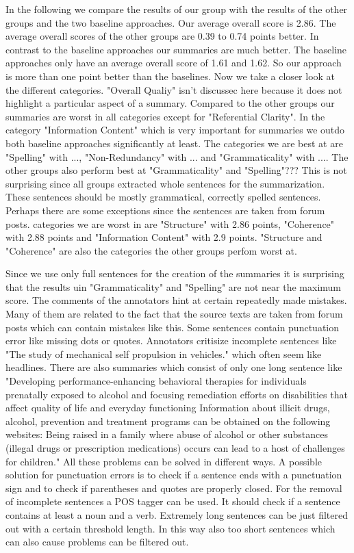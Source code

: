 In the following we compare the results of our group with the results of the other groups and the two baseline approaches. Our average overall score is 2.86. The average overall scores of the other groups are 0.39 to 0.74 points better. In contrast to the baseline approaches our summaries are much better. The baseline approaches only have an average overall score of 1.61 and 1.62. So our approach is more than one point better than the baselines. Now we take a closer look at the different categories. "Overall Qualiy" isn't discussec here because it does not highlight a particular aspect of a summary. Compared to the other groups our summaries are worst in all categories except for "Referential Clarity". In the category "Information Content" which is very important for summaries we outdo both baseline approaches significantly at least. The categories we are best at are "Spelling" with ..., "Non-Redundancy" with ... and "Grammaticality" with .... The other groups also perform best at "Grammaticality" and "Spelling"??? This is not surprising since all groups extracted whole sentences for the summarization. These sentences should be mostly grammatical, correctly spelled sentences. Perhaps there are some exceptions since the sentences are taken from forum posts. categories we are worst in are "Structure" with 2.86 points, "Coherence" with 2.88 points and "Information Content" with 2.9 points. "Structure and "Coherence" are also the categories the other groups perfom worst at.

Since we use only full sentences for the creation of the summaries it is surprising that the results uin "Grammaticality" and "Spelling" are not near the maximum score. The comments of the annotators hint at certain repeatedly made mistakes. Many of them are related to the fact that the source texts are taken from forum posts which can contain mistakes like this. Some sentences contain punctuation error like missing dots or quotes. Annotators critisize incomplete sentences like "The study of mechanical self propulsion in vehicles." which often seem like headlines.  There are also summaries which consist of only one long sentence like "Developing performance-enhancing behavioral therapies for individuals prenatally exposed to alcohol and focusing remediation efforts on disabilities that affect quality of life and everyday functioning Information about illicit drugs, alcohol, prevention and treatment programs can be obtained on the following websites: Being raised in a family where abuse of alcohol or other substances (illegal drugs or prescription medications) occurs can lead to a host of challenges for children." All these problems can be solved in different ways. A possible solution for punctuation errors is to check if a sentence ends with a punctuation sign and to check if parentheses and quotes are properly closed. For the removal of incomplete sentences a POS tagger can be used. It should check if a sentence contains at least a noun and a verb. Extremely long sentences can be just filtered out with a certain threshold length. In this way also too short sentences which can also cause problems can be filtered out.

